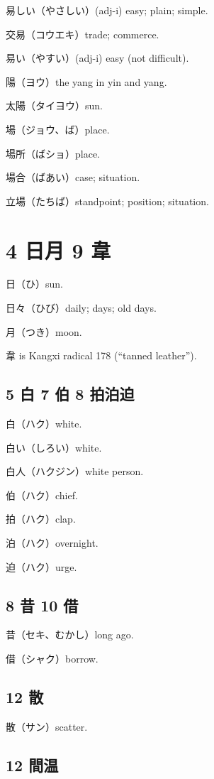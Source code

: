 易しい（やさしい）(adj-i) easy; plain; simple.

交易（コウエキ）trade; commerce.

易い（やすい）(adj-i) easy (not difficult).

陽（ヨウ）the yang in yin and yang.

太陽（タイヨウ）sun.

場（ジョウ、ば）place.

場所（ばショ）place.

場合（ばあい）case; situation.

立場（たちば）standpoint; position; situation.

\section{4 日月 9 韋}

日（ひ）sun.

日々（ひび）daily; days; old days.

月（つき）moon.

韋 is Kangxi radical 178 (``tanned leather'').

\subsection{5 白 7 伯 8 拍泊迫}

白（ハク）white.

白い（しろい）white.

白人（ハクジン）white person.

伯（ハク）chief.

拍（ハク）clap.

泊（ハク）overnight.

迫（ハク）urge.

\subsection{8 昔 10 借}

昔（セキ、むかし）long ago.

借（シャク）borrow.

\subsection{12 散}

散（サン）scatter.

\subsection{12 間温}


